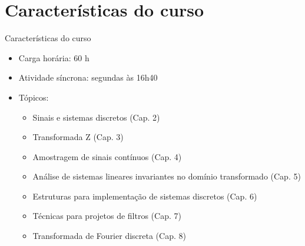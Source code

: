    \section[ slide = true]{Características do curso}
      \begin{slide}[toc=]{Características do curso}
         \begin{itemize}
            \item Carga horária: 60 h
            \item Atividade síncrona: segundas às 16h40
            \item Tópicos:
            \begin{itemize}
               \item Sinais e sistemas discretos (Cap. 2)
               \item Transformada Z (Cap. 3)
               \item Amostragem de sinais contínuos (Cap. 4)
               \item Análise de sistemas lineares invariantes no domínio transformado (Cap. 5)
               \item Estruturas para implementação de sistemas discretos (Cap. 6)
               \item Técnicas para projetos de filtros (Cap. 7)
               \item Transformada de Fourier discreta (Cap. 8)
            \end{itemize}
         \end{itemize}         
      \end{slide}
      

